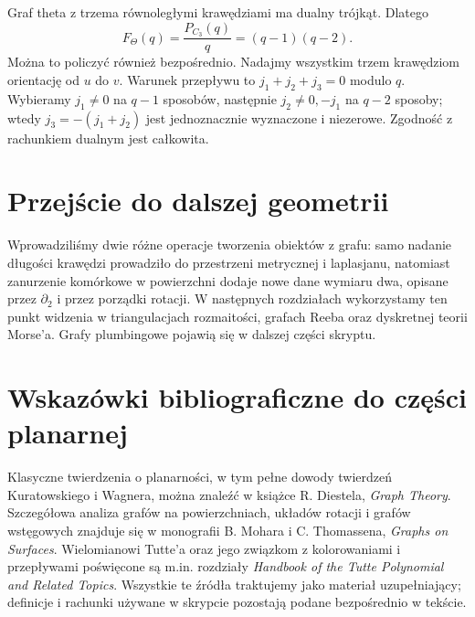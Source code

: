 \begin{przyklad}
Graf theta z trzema równoległymi krawędziami ma dualny
trójkąt. Dlatego
\[
 F_{\Theta}(q)=\frac{P_{C_3}(q)}{q}=(q-1)(q-2).
\]
Można to policzyć również bezpośrednio. Nadajmy wszystkim
trzem krawędziom orientację od $u$ do $v$.
Warunek przepływu to $j_1+j_2+j_3=0$ modulo $q$.
Wybieramy $j_1\ne0$ na $q-1$ sposobów, następnie
$j_2\ne0,-j_1$ na $q-2$ sposoby; wtedy
$j_3=-(j_1+j_2)$ jest jednoznacznie wyznaczone i niezerowe.
Zgodność z rachunkiem dualnym jest całkowita.
\end{przyklad}

\section*{Przejście do dalszej geometrii}
Wprowadziliśmy dwie różne operacje tworzenia obiektów
z grafu: samo nadanie długości krawędzi prowadziło
do przestrzeni metrycznej i laplasjanu, natomiast
zanurzenie komórkowe w powierzchni dodaje nowe dane
wymiaru dwa, opisane przez $\partial_2$ i przez porządki
rotacji. W następnych rozdziałach wykorzystamy ten punkt widzenia
w triangulacjach rozmaitości, grafach Reeba oraz dyskretnej
teorii Morse'a. Grafy plumbingowe pojawią się w dalszej części skryptu.

\section*{Wskazówki bibliograficzne do części planarnej}
Klasyczne twierdzenia o planarności, w tym pełne dowody
twierdzeń Kuratowskiego i Wagnera, można znaleźć w książce
R. Diestela, \emph{Graph Theory}. Szczegółowa analiza
grafów na powierzchniach, układów rotacji i grafów wstęgowych
znajduje się w monografii B. Mohara i C. Thomassena,
\emph{Graphs on Surfaces}. Wielomianowi Tutte'a oraz jego
związkom z kolorowaniami i przepływami poświęcone są m.in.
rozdziały \emph{Handbook of the Tutte Polynomial and Related Topics}.
Wszystkie te źródła traktujemy jako materiał uzupełniający;
definicje i rachunki używane w skrypcie pozostają podane
bezpośrednio w tekście.


